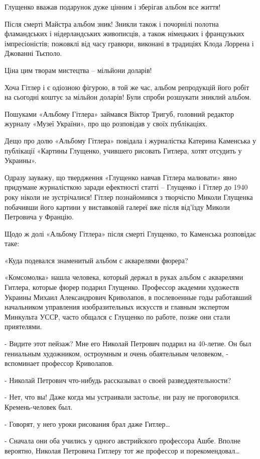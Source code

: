 Глущенко вважав подарунок дуже цінним і зберігав альбом все життя!

Після смерті Майстра альбом зник! Зникли також і почорнілі полотна фламандських
і нідерландських живописців, а також німецьких і французьких імпресіоністів;
пожовклі від часу гравюри, виконані в традиціях Клода Лоррена і Джованні
Тьєполо. 

Ціна цим творам мистецтва – мільйони доларів!

Хоча Гітлер і є одіозною фігурою, в той же час, альбом репродукцій його робіт
на сьогодні коштує за мільйон доларів! Були спроби розшукати зниклий альбом. 

Пошуками «Альбому Гітлера» займався Віктор Тригуб, головний редактор журналу
«Музеї України», про що розповідав у своїх публікаціях.

Дещо про долю «Альбому Гітлера» повідала і журналістка Катерина Каменська у
публікації «Картины Глущенко, учившего рисовать Гитлера, хотят отсудить у
Украины».

Одразу зауважу, що твердження «Глущенко навчав Гітлера малювати» явно придумане
журналісткою заради ефектності статті – Глущенко і Гітлер до 1940 року ніколи
не зустрічалися! Гітлер познайомився з творчістю Миколи Глущенка побачивши його
картини у виставковій галереї вже після від’їзду Миколи Петровича у Францію.

Щодо ж долі «Альбому Гітлера» після смерті Глущенко, то Каменська розповідає
таке:

«Куда подевался знаменитый альбом с акварелями фюрера?

«Комсомолка» нашла человека, который держал в руках альбом с акварелями
Гитлера, которые фюрер подарил Глущенко. Профессор академии художеств Украины
Михаил Александрович Криволапов, в послевоенные годы работавший начальником
управления изобразительных искусств и главным экспертом Минкульта УССР, часто
общался с Глущенко по работе, позже они стали приятелями.

- Видите этот пейзаж? Мне его Николай Петрович подарил на 40-летие. Он был
гениальным художником, остроумным и очень обаятельным человеком, - вспоминает
профессор Криволапов.

- Николай Петрович что-нибудь рассказывал о своей разведдеятельности?

- Нет, что вы! Даже когда мы устраивали застолье, ни разу не проговорился.
Кремень-человек был.

- Говорят, у него уроки рисования брал даже Гитлер…

- Сначала они оба учились у одного австрийского профессора Ашбе. Вполне
вероятно, Николая Петровича Гитлеру тот же профессор и порекомендовал…

